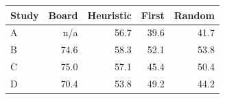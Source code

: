 \begin{tabular}{@{}lrrrr@{}}
\toprule
Study & Board & Heuristic & First & Random \\
\midrule
A & n/a & 56.7 & 39.6 & 41.7 \\
B & 74.6 & 58.3 & 52.1 & 53.8 \\
C & 75.0 & 57.1 & 45.4 & 50.4 \\
D & 70.4 & 53.8 & 49.2 & 44.2 \\
\bottomrule
\end{tabular}
